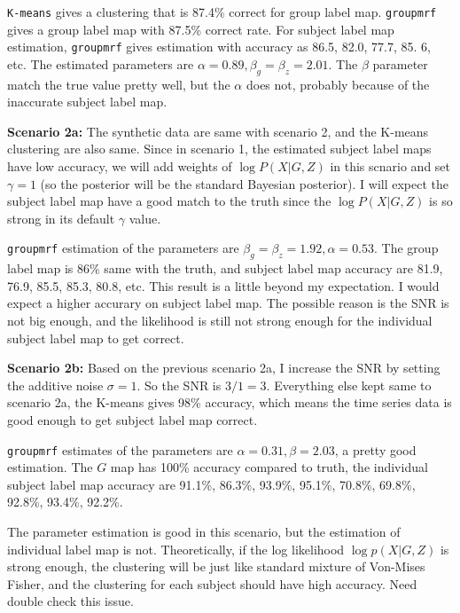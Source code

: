 \documentclass{article}
\begin{document}
\texttt{K-means} gives a clustering that is 87.4\% correct for group label map. \texttt{groupmrf} gives a group label map with 87.5\% correct rate. For subject label map estimation, \texttt{groupmrf} gives estimation with accuracy as 86.5, 82.0, 77.7, 85. 6, etc. The estimated parameters are $\alpha = 0.89, \beta_g = \beta_z = 2.01 $. The $\beta$ parameter match the true value pretty well, but the $\alpha$ does not, probably because of the inaccurate subject label map.

\textbf{Scenario 2a: }  The synthetic data are same with scenario 2, and the K-means clustering are also same. Since in scenario 1, the estimated subject label maps have low accuracy, we will add weights of $\log P(X|G,Z)$ in this scnario and set $\gamma = 1$ (so the posterior will be the standard Bayesian posterior). I will expect the subject label map have a good match to the truth since the $\log P(X|G,Z)$  is so strong in its default $\gamma$ value. 

\texttt{groupmrf} estimation of the parameters are $\beta_g = \beta_z = 1.92, \alpha = 0.53$. The group label map is 86\% same with the truth, and subject label map accuracy are 81.9, 76.9, 85.5, 85.3, 80.8, etc. This result is a little beyond my expectation. I would expect a higher accurary on subject label map. The possible reason is the SNR is not big enough, and the likelihood is still not strong enough for the individual subject label map to get correct.


\textbf{Scenario 2b: } Based on the previous scenario 2a, I increase the SNR by setting the additive noise $\sigma = 1$. So the SNR is $3/1 = 3$. Everything else kept same to scenario 2a, the K-means gives 98\% accuracy, which means the time series data is good enough to get subject label map correct.

\texttt{groupmrf} estimates of the parameters are $\alpha = 0.31, \beta = 2.03$, a pretty good estimation. The $G$ map has 100\% accuracy compared to truth, the individual subject label map accuracy are 91.1\%, 86.3\%, 93.9\%, 95.1\%, 70.8\%, 69.8\%, 92.8\%, 93.4\%, 92.2\%. 

The parameter estimation is good in this scenario, but the estimation of individual label map is not. Theoretically, if the log likelihood $\log p(X|G,Z)$ is strong enough, the clustering will be just like standard mixture of Von-Mises Fisher, and the clustering for each subject should have high accuracy. Need double check this issue.
\end{document}
